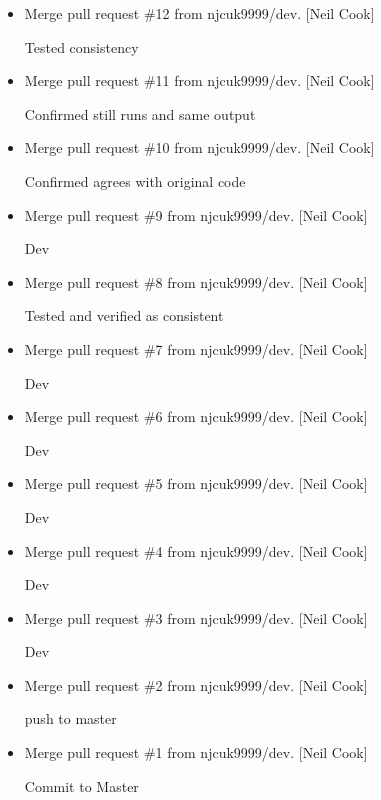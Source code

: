 \documentclass[a4paper,10pt,english]{report}
\begin{document}
\begin{itemize}
\item {} 
Merge pull request \#12 from njcuk9999/dev. {[}Neil Cook{]}

Tested consistency

\item {} 
Merge pull request \#11 from njcuk9999/dev. {[}Neil Cook{]}

Confirmed still runs and same output

\item {} 
Merge pull request \#10 from njcuk9999/dev. {[}Neil Cook{]}

Confirmed agrees with original code

\item {} 
Merge pull request \#9 from njcuk9999/dev. {[}Neil Cook{]}

Dev

\item {} 
Merge pull request \#8 from njcuk9999/dev. {[}Neil Cook{]}

Tested and verified as consistent

\item {} 
Merge pull request \#7 from njcuk9999/dev. {[}Neil Cook{]}

Dev

\item {} 
Merge pull request \#6 from njcuk9999/dev. {[}Neil Cook{]}

Dev

\item {} 
Merge pull request \#5 from njcuk9999/dev. {[}Neil Cook{]}

Dev

\item {} 
Merge pull request \#4 from njcuk9999/dev. {[}Neil Cook{]}

Dev

\item {} 
Merge pull request \#3 from njcuk9999/dev. {[}Neil Cook{]}

Dev

\item {} 
Merge pull request \#2 from njcuk9999/dev. {[}Neil Cook{]}

push to master

\item {} 
Merge pull request \#1 from njcuk9999/dev. {[}Neil Cook{]}

Commit to Master

\end{itemize}
\end{document}
